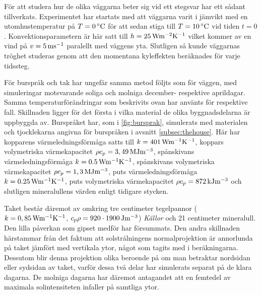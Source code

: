 För att studera hur de olika väggarna beter sig vid ett stegsvar har ett sådant tillverkats. Experimentet
har startats med att väggarna varit i jämvikt med en utomhustemperatur på $T = \unit[0]{^\circ C}$ för att
sedan stiga till $T = \unit[10]{^\circ C}$ vid tiden $t=0$. Konvektionsparametern är här satt till
$h = \unit[25]{W m^{-2}K^{-1}}$ vilket kommer av en vind på
$v = \unit[5]{ms^{-1}}$ paralellt med väggens yta. Slutligen så kunde väggarnas
tröghet studeras genom att den momentana kyleffekten beräknades för varje tidssteg. 

För burspråk och tak har ungefär samma metod följts som för väggen, med simuleringar motsvarande soliga och
molniga december- respektive aprildagar. Samma temperaturförändringar som beskrivits ovan har använts för
respektive fall. Skillnaden ligger för det första i vilka material de olika byggnadsdelarna är uppbyggda av.
Burspråket har, som i \ref{fig:bursprak}, simulerats med materialen och tjocklekarna angivna för burspråken i avsnitt \ref{subsec:thehouse}.
Här har kopparens värmeledningsförmåga satts till $k=\unit[401]{Wm^{-1}K^{-1}}$, koppars volymetriska värmekapacitet
$\rho c_p = \unit[3,49]{MJm^{-3}}$, spånskivans värmeledningsförmåga $k = \unit[0.5]{Wm^{-1}K^{-1}}$, spånskivans volymetriska
värmekapacitet $\rho c_p = \unit[1,3]{MJm^{-3}}$, puts värmeledningsförmåga $k = \unit[0.25]{Wm^{-1}K^{-1}}$, puts volymetriska
värmekapacitet $\rho c_p = \unit[872]{kJm^{-3}}$ och slutligen mineralullens värden
enligt tidigare stycken.
\cite{engineeringcom}\cite{kandidatarbete2010}\cite{engineeringtoolboxthermalconductivity}\cite{engineeringtoolboxspecificheat}

Taket består
däremot av omkring tre centimeter tegelpannor ($k = \unit[0,85]{Wm^{-1}K^{-1}}$, $c_p\rho = \unit[920\cdot 1900]{Jm^{-3}}$)
\emph{\color{red} Källor} och 21 centimeter mineralull. Den lilla påverkan som gipset medför har försummats. Den andra skillnaden härstammar från det faktum att solstrålningens normalprojektion är annorlunda på taket jämfört med vertikala ytor, något som tagits med i beräkningarna. Dessutom blir denna projektion olika beroende på om man betraktar nordsidan eller sydsidan av taket, varför dessa två delar har simulerats separat på de klara dagarna. De molniga dagarna har däremot antagandet att en femtedel av maximala solintensiteten infaller på samtliga ytor.


